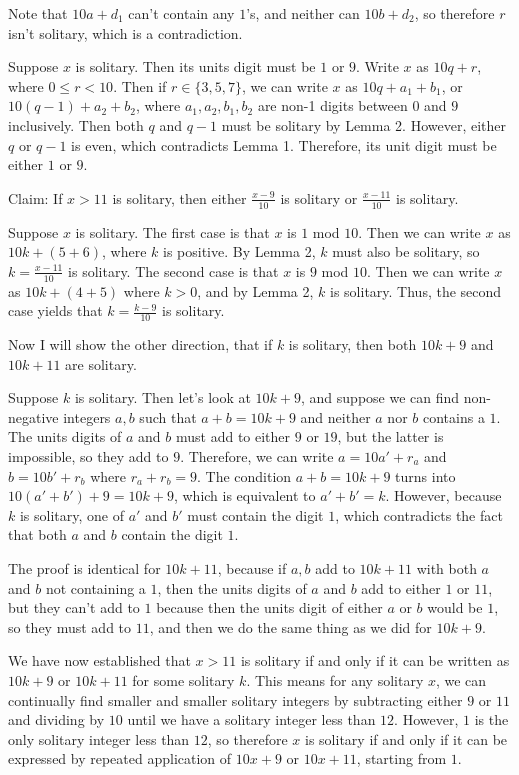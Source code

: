 \begin{enumerate}
 Note that $10a + d_1$ can't contain any $1$'s, and neither can $10b + d_2$, so therefore $r$ isn't solitary, which is a contradiction.

 Suppose $x$ is solitary. Then its units digit must be $1$ or $9$. Write $x$ as $10q + r$, where $0 \le r < 10$. Then if $r \in \{ 3,5,7\}$, we can write $x$ as $10q + a_1 + b_1$, or $10(q-1) + a_2 + b_2$, where $a_1, a_2, b_1, b_2$ are non-1 digits between $0$ and $9$ inclusively. Then both $q$ and $q-1$ must be solitary by Lemma 2. However, either $q$ or $q-1$ is even, which contradicts Lemma 1. Therefore, its unit digit must be either $1$ or $9$.

 Claim: If $x > 11$ is solitary, then either $\frac{x-9}{10}$ is solitary or $\frac{x-11}{10}$ is solitary.

 Suppose $x$ is solitary. The first case is that $x$ is $1$ mod $10$. Then we can write $x$ as $10k + (5 +6)$, where $k$ is positive. By Lemma 2, $k$ must also be solitary, so $k = \frac{x-11}{10}$ is solitary. The second case is that $x$ is $9$ mod $10$. Then we can write $x$ as $10k + ( 4 + 5)$ where $k > 0$, and by Lemma 2, $k$ is solitary. Thus, the second case yields that $k = \frac{k-9}{10}$ is solitary.

 Now I will show the other direction, that if $k$ is solitary, then both $10k + 9$ and $10k + 11$ are solitary. 

 Suppose $k$ is solitary. Then let's look at $10k+ 9$, and suppose we can find non-negative integers $a,b$ such that $a+ b = 10k + 9$ and neither $a$ nor $b$ contains a $1$. The units digits of $a$ and $b$ must add to either $9$ or $19$, but the latter is impossible, so they add to $9$. Therefore, we can write $a = 10a' + r_a$ and $b = 10b' + r_b$ where $r_a + r_b = 9$. The condition $a + b = 10k + 9$ turns into $10(a' + b') + 9 = 10k + 9$, which is equivalent to $a' + b' = k$. However, because $k$ is solitary, one of $a'$ and $b'$ must contain the digit $1$, which contradicts the fact that both $a$ and $b$ contain the digit $1$. 

 The proof is identical for $10k + 11$, because if $a, b$ add to $10k+ 11$ with both $a$ and $b$ not containing a $1$, then the units digits of $a$ and $b$ add to either $1$ or $11$, but they can't add to $1$ because then the units digit of either $a$ or $b$ would be $1$, so they must add to $11$, and then we do the same thing as we did for $10k + 9$.

 We have now established that $x > 11$ is solitary if and only if it can be written as $10k + 9$ or $10k + 11$ for some solitary $k$. This means for any solitary $x$, we can continually find smaller and smaller solitary integers by subtracting either $9$ or $11$ and dividing by $10$ until we have a solitary integer less than $12$. However, $1$ is the only solitary integer less than $12$, so therefore $x$ is solitary if and only if it can be expressed by repeated application of $10x + 9$ or $10x + 11$, starting from $1$.


\end{enumerate}
